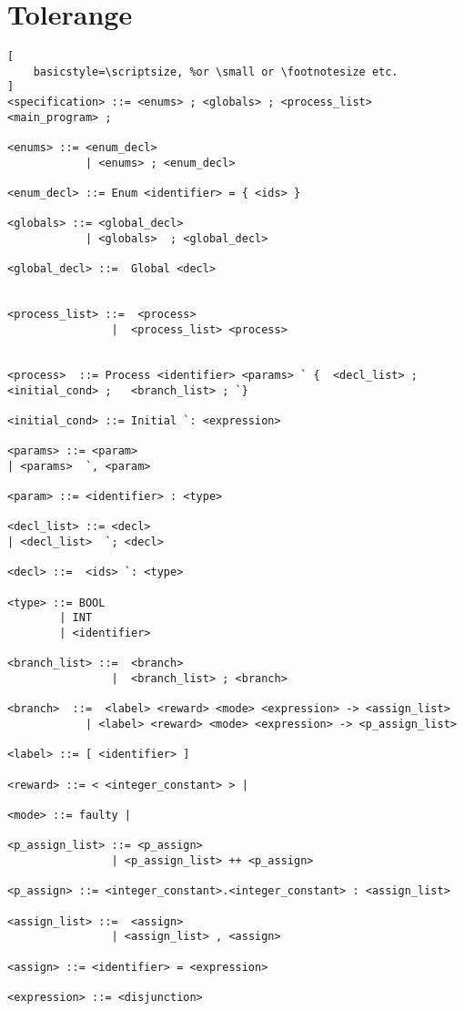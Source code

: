 \section{Tolerange} \label{sec:tolerangeGrammar}

\begin{lstlisting}[
    basicstyle=\scriptsize, %or \small or \footnotesize etc.
]
<specification> ::= <enums> ; <globals> ; <process_list>  <main_program> ;

<enums> ::= <enum_decl>
            | <enums> ; <enum_decl>

<enum_decl> ::= Enum <identifier> = { <ids> }

<globals> ::= <global_decl>
            | <globals>  ; <global_decl>

<global_decl> ::=  Global <decl>


<process_list> ::=  <process>
                |  <process_list> <process>


<process>  ::= Process <identifier> <params> ` {  <decl_list> ; <initial_cond> ;   <branch_list> ; `}

<initial_cond> ::= Initial `: <expression>

<params> ::= <param> 
| <params>  `, <param>

<param> ::= <identifier> : <type>

<decl_list> ::= <decl> 
| <decl_list>  `; <decl>

<decl> ::=  <ids> `: <type> 

<type> ::= BOOL 
        | INT 
        | <identifier>

<branch_list> ::=  <branch> 
                |  <branch_list> ; <branch>

<branch>  ::=  <label> <reward> <mode> <expression> -> <assign_list>
            | <label> <reward> <mode> <expression> -> <p_assign_list>

<label> ::= [ <identifier> ] 

<reward> ::= < <integer_constant> > |

<mode> ::= faulty |

<p_assign_list> ::= <p_assign>
                | <p_assign_list> ++ <p_assign>

<p_assign> ::= <integer_constant>.<integer_constant> : <assign_list>

<assign_list> ::=  <assign>
                | <assign_list> , <assign>

<assign> ::= <identifier> = <expression>
            
<expression> ::= <disjunction>


\end{lstlisting}
